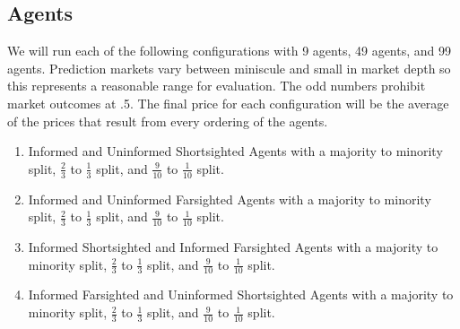 \subsection{Agents}
We will run each of the following configurations with 9 agents, 49 agents, and 99 agents. Prediction markets vary between miniscule and small in market depth so this represents a reasonable range for evaluation. The odd numbers prohibit market outcomes at .5. The final price for each configuration will be the average of the prices that result from every ordering of the agents.
\begin{enumerate}
\item Informed and Uninformed Shortsighted Agents with a majority to minority split, $\frac{2}{3}$ to $\frac{1}{3}$ split, and $\frac{9}{10}$ to $\frac{1}{10}$ split.
\item Informed and Uninformed Farsighted Agents with a majority to minority split, $\frac{2}{3}$ to $\frac{1}{3}$ split, and $\frac{9}{10}$ to $\frac{1}{10}$ split.
\item Informed Shortsighted and Informed Farsighted Agents with a majority to minority split, $\frac{2}{3}$ to $\frac{1}{3}$ split, and $\frac{9}{10}$ to $\frac{1}{10}$ split.
\item Informed Farsighted and Uninformed Shortsighted Agents with a majority to minority split, $\frac{2}{3}$ to $\frac{1}{3}$ split, and $\frac{9}{10}$ to $\frac{1}{10}$ split.
\end{enumerate}

